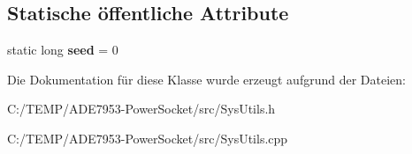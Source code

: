 \subsection*{Statische öffentliche Attribute}
\begin{DoxyCompactItemize}
\item 
\mbox{\label{class_sys_utils_a9419bcdbf1047a6aa8b92361416c1d75}} 
static long {\bfseries seed} = 0
\end{DoxyCompactItemize}


Die Dokumentation für diese Klasse wurde erzeugt aufgrund der Dateien\+:\begin{DoxyCompactItemize}
\item 
C\+:/\+T\+E\+M\+P/\+A\+D\+E7953-\/\+Power\+Socket/src/Sys\+Utils.\+h\item 
C\+:/\+T\+E\+M\+P/\+A\+D\+E7953-\/\+Power\+Socket/src/Sys\+Utils.\+cpp\end{DoxyCompactItemize}

